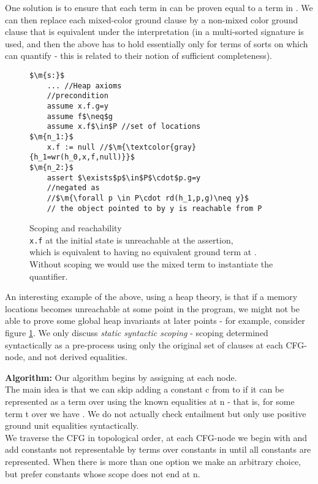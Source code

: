 One solution is to ensure that each term in \langt can be proven equal to a term in \langb. 
We can then replace each mixed-color ground clause by a non-mixed color ground clause that is equivalent under the interpretation
(in \cite{BaumgartnerWaldmann13} a multi-sorted signature is used, and then the above has to hold essentially only for terms of sorts on which  can quantify - this is related to their notion of sufficient completeness).

\begin{figure}
\begin{lstlisting}
$\m{s:}$
	... //Heap axioms
	//precondition
	assume x.f.g=y
	assume f$\neq$g
	assume x.f$\in$P //set of locations
$\m{n_1:}$
	x.f := null //$\m{\textcolor{gray}{h_1=wr(h_0,x,f,null)}}$
$\m{n_2:}$
	assert $\exists$p$\in$P$\cdot$p.g=y
	//negated as
	//$\m{\forall p \in P\cdot rd(h_1,p,g)\neq y}$ 
	// the object pointed to by y is reachable from P
\end{lstlisting}
\caption{Scoping and reachability\\
\lstinline|x.f| at the initial state is unreachable at the assertion,\\
which is equivalent to  having no equivalent ground term at .\\
Without scoping we would use the mixed term  to instantiate the quantifier.
}
\label{snippet4.2.4.1}
\end{figure}

An interesting example of the above, using a heap theory, is that if a memory locations becomes unreachable at some point in the program, we might not be able to prove some global heap invariants at later points - for example, consider figure \ref{snippet4.2.4.1}.
We only discuss \emph{static syntactic scoping} - scoping determined syntactically as a pre-process using only the original set of clauses at each CFG-node, and not derived equalities. 

\textbf{Algorithm:}
Our algorithm begins by assigning  at each node.\\
The main idea is that we can skip adding a constant c from  to  if it can be represented as a term over  using the known equalities at n - that is, for some term t over  we have . We do not actually check entailment but only use positive ground unit equalities syntactically. \\
We traverse the CFG in topological order, at each CFG-node we begin with  and add constants not representable by terms over constants in  until all constants are represented. When there is more than one option we make an arbitrary choice,
but prefer constants whose scope does not end at n.

